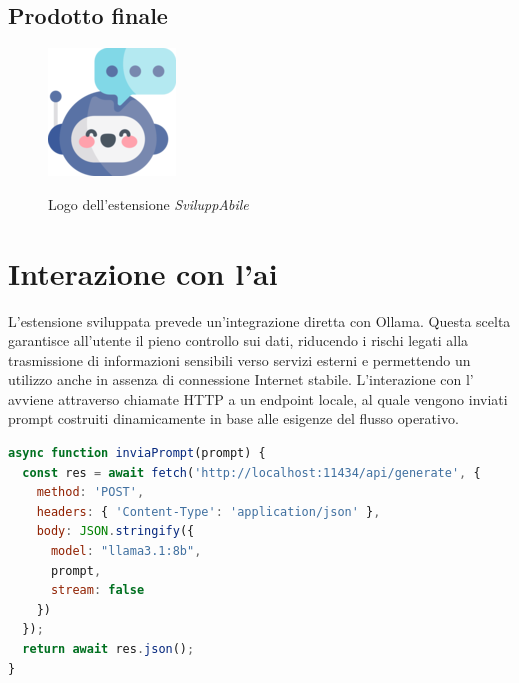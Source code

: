 \subsection{Prodotto finale}

\begin{figure}[H]
    \centering
    \includegraphics[width=0.15\linewidth, alt={Logo dell'estensione \textit{SviluppAbile}}]{img/sviluppabile.png}
    \caption{Logo dell'estensione \textit{SviluppAbile}}\label{fig:logo_sviluppabile}
\end{figure}


\section{Interazione con l'\acrshort{ai}}
\noindent L’estensione sviluppata prevede un’integrazione diretta con Ollama. Questa scelta garantisce all’utente il pieno controllo sui dati, riducendo i rischi legati alla trasmissione di informazioni sensibili verso servizi esterni e permettendo un utilizzo anche in assenza di connessione Internet stabile. L’interazione con l’ avviene attraverso chiamate HTTP a un endpoint locale, al quale vengono inviati prompt costruiti dinamicamente in base alle esigenze del flusso operativo.

\begin{lstlisting}[language=JavaScript, caption={Funzione di interazione con Ollama}]
async function inviaPrompt(prompt) {
  const res = await fetch('http://localhost:11434/api/generate', {
    method: 'POST',
    headers: { 'Content-Type': 'application/json' },
    body: JSON.stringify({
      model: "llama3.1:8b",
      prompt,
      stream: false
    })
  });
  return await res.json();
}
\end{lstlisting}

